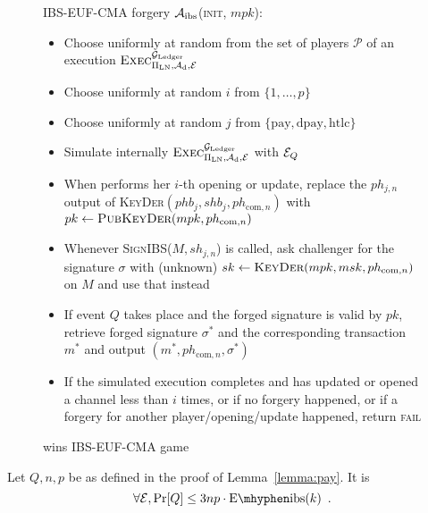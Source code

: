   \begin{figure}[!htbp]
    \begin{algobox}{\textsf{IBS-EUF-CMA} forgery}
      $\mathcal{A}_{\mathrm{ibs}}$(\textsc{init}, $mpk$):
      \begin{itemize}
        \item Choose uniformly at random \alice{} from the set of players
        $\mathcal{P}$ of an execution
        $\textsc{Exec}^{\mathcal{G}_{\mathrm{Ledger}}}_{\Pi_{\mathrm{LN}}, \mathcal{A}_{\mathrm{d}},
        \mathcal{E}}$
        \item Choose uniformly at random $i$ from $\{1, \dots, p\}$
        \item Choose uniformly at random $j$ from $\{\mathrm{pay},
        \mathrm{dpay}, \mathrm{htlc}\}$
        \item Simulate internally
        $\textsc{Exec}^{\mathcal{G}_{\mathrm{Ledger}}}_{\Pi_{\mathrm{LN}}, \mathcal{A}_{\mathrm{d}},
        \mathcal{E}}$ with $\mathcal{E}_Q$
        \item When \alice{} performs her $i$-th opening or update, replace the
        $ph_{j, n}$ output of \textsc{KeyDer}$(phb_j, shb_j, ph_{\mathrm{com},
        n})$ with $pk \gets \textsc{PubKeyDer}(mpk, ph_{\mathrm{com}, n})$
        \item Whenever \textsc{SignIBS}($M, sh_{j, n}$) is called, ask
        challenger for the signature $\sigma$ with (unknown) $sk \gets
        \textsc{KeyDer}(mpk, msk, ph_{\mathrm{com}, n})$ on $M$ and use that
        instead
        \item If event $Q$ takes place and the forged signature is valid by
        $pk$, retrieve forged signature $\sigma^*$ and the corresponding
        transaction $m^*$ and output $(m^*, ph_{\mathrm{com}, n},\sigma^*)$
        \item If the simulated execution completes and \alice{} has updated or
        opened a channel less than $i$ times, or if no forgery happened, or if a
        forgery for another player/opening/update happened, return \textsc{fail}
      \end{itemize}
    \end{algobox}
    \caption{wins \textsf{IBS-EUF-CMA} game}
    \label{alg:forge:ibs}
  \end{figure}

  \begin{proposition}
  \label{prop:forgery:ibs}
    Let $Q, n, p$ be as defined in the proof of Lemma~\ref{lemma:pay}. It is
    \begin{equation*}
      \forall \environment, \Pr[Q] \leq 3np \cdot \mathrm{E \mhyphen ibs}(k)
      \enspace.
    \end{equation*}
  \end{proposition}


